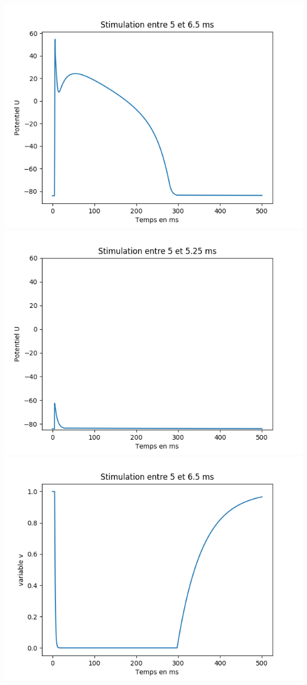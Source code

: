 \documentclass[a4paper,12pt,twoside]{report}
\begin{document}
\includegraphics[scale=0.5]{./u(t).png}\\
\includegraphics[scale=0.5]{./u(t)_2.png}\\
\includegraphics[scale=0.5]{./v(t).png}\\
\end{document}
